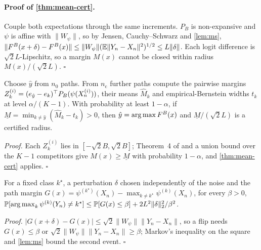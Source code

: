 \paragraph{Proof of \cref{thm:mean-cert}.} Couple both expectations through the
same increments. $P_B$ is non-expansive and $\psi$ is affine with $\|W_\psi\|$,
so by Jensen, Cauchy--Schwarz and \cref{lem:ms},
$\|F^B(x+\delta)-F^B(x)\|\le\|W_\psi\|(\mathbb{E}\|Y_n-X_n\|^2)^{1/2}\le L\|\delta\|$.
Each logit difference is $\sqrt2L$-Lipschitz, so a margin $M(x)$ cannot be closed
within radius $M(x)/(\sqrt2L)$. \hfill$\square$

\begin{corollary}\label{cor:mc}
Choose $\hat y$ from $n_0$ paths. From $n_{\mathrm c}$ further paths compute the
pairwise margins $Z^{(i)}_k=(e_{\hat y}-e_k)^\top P_B(\psi(X^{(i)}_n))$, their
means $\hat M_k$ and empirical-Bernstein widths $t_k$ \citep{maurer2009bernstein}
at level $\alpha/(K-1)$. With probability at least $1-\alpha$, if
$\underline M=\min_{k\ne\hat y}(\hat M_k-t_k)>0$, then $\hat y=\operatorname*{arg\,max} F^B(x)$ and
$\underline M/(\sqrt2L)$ is a certified radius.
\end{corollary}
\emph{Proof.} Each $Z^{(i)}_k$ lies in $[-\sqrt2B,\sqrt2B]$; Theorem~4 of
\citet{maurer2009bernstein} and a union bound over the $K-1$ competitors give
$M(x)\ge\underline M$ with probability $1-\alpha$, and \cref{thm:mean-cert}
applies. \hfill$\square$

\begin{proposition}\label{prop:flip}
For a fixed class $k^\star$, a perturbation $\delta$ chosen independently of the
noise and the path margin $G(x)=\psi^{(k^\star)}(X_n)-\max_{k\ne k^\star}\psi^{(k)}(X_n)$,
for every $\beta>0$,
$\mathbb{P}[\operatorname*{arg\,max}_k\psi^{(k)}(Y_n)\ne k^\star]\le\mathbb{P}[G(x)\le\beta]+2L^2\|\delta\|_2^2/\beta^2$.
\end{proposition}
\emph{Proof.} $|G(x+\delta)-G(x)|\le\sqrt2\|W_\psi\|\|Y_n-X_n\|$, so a flip needs
$G(x)\le\beta$ or $\sqrt2\|W_\psi\|\|Y_n-X_n\|\ge\beta$; Markov's inequality on the
square and \cref{lem:ms} bound the second event. \hfill$\square$



